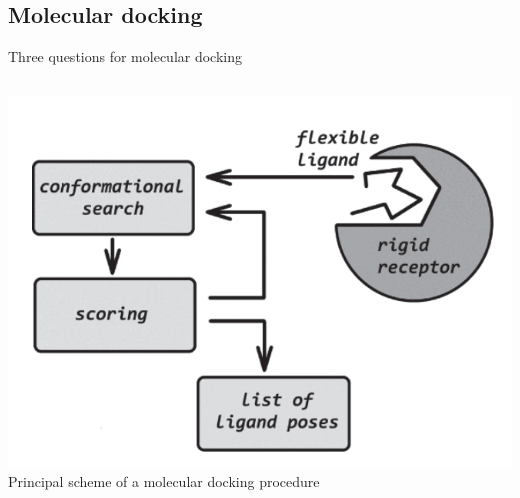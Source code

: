 \subsection{Molecular docking}
\begin{frame}{Three questions for molecular docking}
   \begin{columns}[T]

   \begin{column}{.4\textwidth}
        \includegraphics[width=\textwidth]{../figures/md_process.png}\\
      {\scriptsize Principal scheme of a molecular docking procedure \footnotemark[1]}
\end{column}


\end{columns}
\end{frame}
